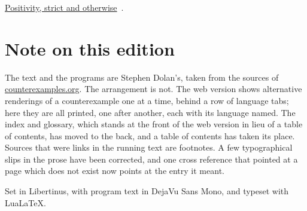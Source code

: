 \documentclass[11pt,oneside]{article}
\newenvironment{indexlist}
  {\par\vspace{0.3\baselineskip}\begingroup
   \setlength{\parindent}{0pt}\setlength{\parskip}{1pt}\small}
  {\endgroup\par\vspace{0.2\baselineskip}}
\newcommand{\indexitem}[2]{%
  \makebox[1.2em]{}\hyperref[#1]{#2}%
  \nobreak\hspace{0.4em}\textcolor{sageline}{\leaders\hbox{\,.\,}\hfill}%
  \hspace{0.4em}\nobreak\textcolor{stone}{\pageref{#1}}\par}
\begin{document}
\begin{indexlist}
\indexitem{ce:strict-positivity}{Positivity, strict and otherwise}
\end{indexlist}

\clearpage
\section*{Note on this edition}
\noindent The text and the programs are Stephen Dolan's, taken from the
sources of \href{https://counterexamples.org}{counterexamples.org}. The
arrangement is not. The web version shows alternative renderings of a
counterexample one at a time, behind a row of language tabs; here they are all
printed, one after another, each with its language named. The index and
glossary, which stands at the front of the web version in lieu of a table of
contents, has moved to the back, and a table of contents has taken its place.
Sources that were links in the running text are footnotes. A few
typographical slips in the prose have been corrected, and one cross reference
that pointed at a page which does not exist now points at the entry it meant.

\vspace{0.8\baselineskip}
\noindent Set in Libertinus, with program text in DejaVu Sans Mono, and
typeset with LuaLaTeX.
\end{document}
